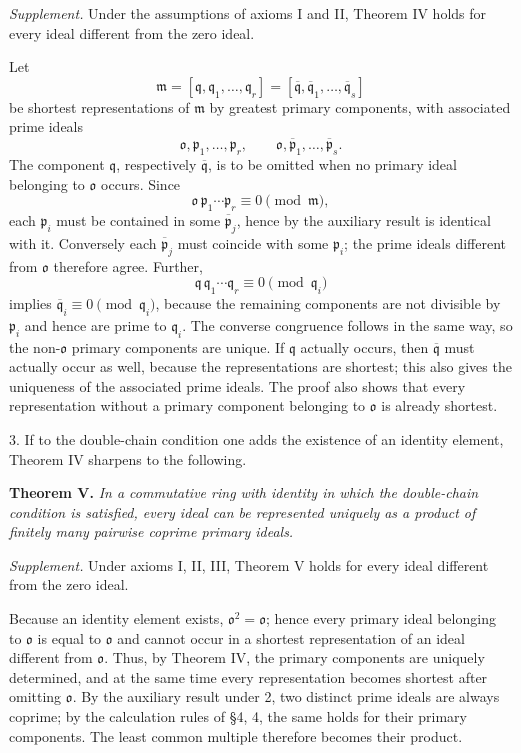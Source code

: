 \documentclass[11pt]{article}
\providecommand{\mm}{\mathfrak{m}}
\providecommand{\mo}{\mathfrak{o}}
\providecommand{\mpideal}{\mathfrak{p}}
\providecommand{\mq}{\mathfrak{q}}
\providecommand{\mbar}[1]{\overline{#1}}
\begin{document}
\emph{Supplement.} Under the assumptions of axioms I and II, Theorem IV holds for every ideal different from the zero ideal.

Let
\[
        \mm=[\mq,\mq_1,\ldots,\mq_r]=[\mbar\mq,\mbar\mq_1,\ldots,\mbar\mq_s]
\]
be shortest representations of $\mm$ by greatest primary components, with associated prime ideals
\[
        \mo,\mpideal_1,\ldots,\mpideal_r,
        \qquad \mo,\mbar\mpideal_1,\ldots,\mbar\mpideal_s.
\]
The component $\mq$, respectively $\mbar\mq$, is to be omitted when no primary ideal belonging to $\mo$ occurs. Since
\[
        \mo\,\mpideal_1\cdots\mpideal_r\equiv0\pmod{\mm},
\]
each $\mpideal_i$ must be contained in some $\mbar\mpideal_j$, hence by the auxiliary result is identical with it. Conversely each $\mbar\mpideal_j$ must coincide with some $\mpideal_i$; the prime ideals different from $\mo$ therefore agree. Further,
\[
        \mq\,\mq_1\cdots\mq_r\equiv0\pmod{\mq_i}
\]
implies $\mbar\mq_i\equiv0\pmod{\mq_i}$, because the remaining components are not divisible by $\mpideal_i$ and hence are prime to $\mq_i$. The converse congruence follows in the same way, so the non-$\mo$ primary components are unique. If $\mq$ actually occurs, then $\mbar\mq$ must actually occur as well, because the representations are shortest; this also gives the uniqueness of the associated prime ideals. The proof also shows that every representation without a primary component belonging to $\mo$ is already shortest.

3. If to the double-chain condition one adds the existence of an identity element, Theorem IV sharpens to the following.

\textbf{Theorem V.} \emph{In a commutative ring with identity in which the double-chain condition is satisfied, every ideal can be represented uniquely as a product of finitely many pairwise coprime primary ideals.}

\emph{Supplement.} Under axioms I, II, III, Theorem V holds for every ideal different from the zero ideal.

Because an identity element exists, $\mo^2=\mo$; hence every primary ideal belonging to $\mo$ is equal to $\mo$ and cannot occur in a shortest representation of an ideal different from $\mo$. Thus, by Theorem IV, the primary components are uniquely determined, and at the same time every representation becomes shortest after omitting $\mo$. By the auxiliary result under 2, two distinct prime ideals are always coprime; by the calculation rules of §4, 4, the same holds for their primary components. The least common multiple therefore becomes their product.
\end{document}
